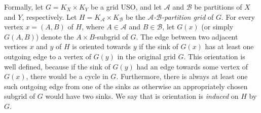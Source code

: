 \documentclass[a4paper,10pt]{article}
\newcommand{\A}{\ensuremath{\mathcal A}}
\newcommand{\B}{\ensuremath{\mathcal B}}
\begin{document}
Formally, let $G = K_X \times K_Y$ be a grid USO,
and let $\A$ and $\B$ be partitions of $X$ and $Y$, respectively.
Let $H = K_\A \times K_\B$ be the \emph{$\A$-$\B$-partition grid} of $G$.
For every vertex $x = (A,B)$ of $H$, where $A\in \A$ and $B \in \B$, let $G(x)$ (or simply $G(A,B)$)
denote the $A \times B$-subgrid of $G$. 
The edge between two adjacent vertices $x$ and $y$ of $H$ is oriented towards $y$ if the sink of $G(x)$ has at least one outgoing edge to a vertex of $G(y)$ in the original grid $G$. 
This orientation is well defined, because if the sink of $G(y)$ had an edge towards some vertex of $G(x)$, there would be a cycle in $G$. 
Furthermore, there is always at least one such outgoing edge from one of the sinks as otherwise an appropriately chosen subgrid of $G$ would have two sinks. 
We say that is orientation is \emph{induced} on $H$ by $G$.
\end{document}
